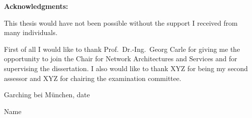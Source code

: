 \thispagestyle{empty}
\vspace*{12\baselineskip}

{\large\textbf{Acknowledgments:} }
\par

This thesis would have not been possible without the support I received from many individuals.

First of all I would like to thank Prof.~Dr.-Ing.~Georg Carle for giving me the opportunity to join the Chair for Network Architectures and Services and for supervising the dissertation. I also would like to thank XYZ for being my second assessor and XYZ for chairing the examination committee.


\vspace{20mm}

\hfill Garching bei M\"unchen, date %

\vspace{5mm}
\hfill Name


\clearpage






